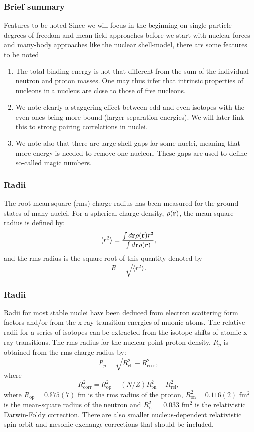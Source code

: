 \documentclass[compress]{beamer}
\begin{document}
\frame
{
  \frametitle{Brief summary}

  \begin{block}{Features to be noted}
Since we will focus in the beginning on single-particle degrees of freedom and mean-field approaches before we
start with nuclear forces and many-body approaches like the nuclear shell-model, there are some features to be noted
\begin{enumerate}
\item  The total binding energy is not that different from the sum of the individual neutron and proton masses. 
One may thus infer that intrinsic properties of nucleons in a nucleus are close to those of free nucleons.
\item We note clearly a staggering effect between odd and even isotopes with the even ones being more bound (larger separation energies). We will later link this to strong pairing correlations in nuclei.
\item We note also that there are large shell-gaps for some nuclei, meaning that more energy is needed to remove one nucleon. These gaps are used to define so-called magic numbers. 
\end{enumerate}
  \end{block}
 }  



\frame
{
  \frametitle{Radii}
\begin{small}
{\scriptsize
The root-mean-square (rms) charge radius has been measured for the ground states of many
nuclei. For a spherical charge density, $\rho({\bf r})$, the mean-square radius is defined by:
\[
\langle r^2\rangle = \frac{ \int  d {\bf r} \rho({\bf r}) r^2}{ \int  d {\bf r} \rho({\bf r})},
\]
and the rms radius is the square root of this quantity denoted by
\[
R =\sqrt{ \langle r^2\rangle}.
\]
}
\end{small}
}

\frame
{
  \frametitle{Radii}
\begin{small}
{\scriptsize

Radii for most stable
nuclei have been deduced from electron scattering form
factors and/or from the x-ray transition energies of muonic atoms. 
The relative radii for a
series of isotopes can be extracted from the isotope shifts of atomic x-ray transitions.
The rms radius for the nuclear point-proton density, $R_p$ is obtained from the rms charge radius by:
\[
R_p = \sqrt{R^2_{\mathrm{ch}}- R^2_{\mathrm{corr}}},
\]
where
\[
R^2_{\mathrm{corr}}= R^2_{\mathrm{op}}+(N/Z)R^2_{\mathrm{on}}+R^2_{\mathrm{rel}},
\]
where $ R_{\mathrm{op}}= 0.875(7)$ fm  is the rms radius of the proton, $R^2_{\mathrm{on}} = 0.116(2)$ fm$^2$ is the
mean-square radius of the neutron and $R^2_{\mathrm{rel}} = 0.033$ fm$^2$ is the relativistic Darwin-Foldy correction. There are also smaller nucleus-dependent relativistic spin-orbit and
mesonic-exchange corrections that should be included.
}
\end{small}
}
\end{document}
